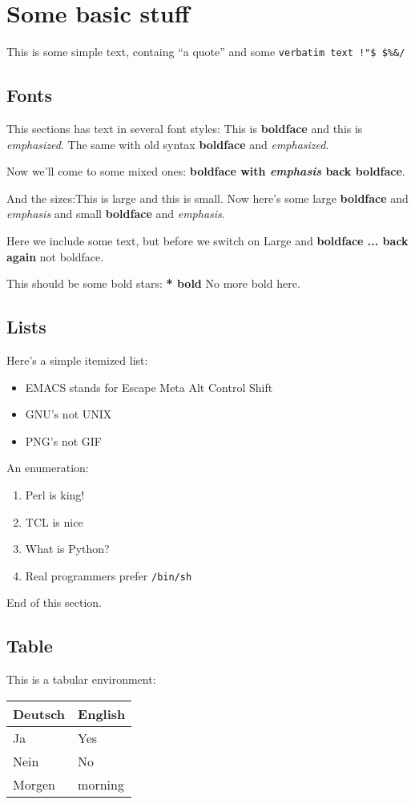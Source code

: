 
\section{Some basic stuff}

This is some simple text, containg ``a quote'' and
some \verb+verbatim text !"$ $%&/+

\subsection{Fonts}

This sections has text in several font styles: This is
\textbf{boldface} and this is \emph{emphasized}. The
same with old syntax {\bf boldface} and {\em emphasized}.

Now we'll come to some mixed ones: {\bf boldface with 
{\em emphasis} back boldface}.

And the sizes:{\large This is large} and {\small this is
small}. Now here's some {\large large {\bf boldface} and
{\em emphasis}} and {\small small {\bf boldface} and
{\em emphasis}}.

Here we include some text, but before we switch on 
{\Large Large and {\bf boldface
%
... back again} not boldface}.

This should be some bold stars: {\bf** bold} No more bold here.

\subsection{Lists}

Here's a simple itemized list:
\begin{itemize}
\item EMACS stands for Escape Meta Alt Control Shift
\item GNU's not UNIX
\item PNG's not GIF
\end{itemize}

An enumeration:

\begin{enumerate}
\item Perl is king!
\item TCL is nice
\item What is Python?
\item Real programmers prefer \texttt{/bin/sh}
\end{enumerate}

End of this section.

\subsection{Table}

This is a tabular environment:

\begin{tabular}{|ll|}
\hline
Deutsch & English \\
\hline\hline
Ja & Yes \\
Nein & No \\
Morgen & morning \\
\hline
\end{tabular}

